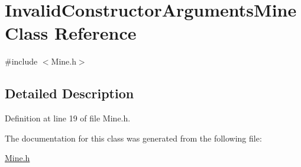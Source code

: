 \hypertarget{classInvalidConstructorArgumentsMine}{\section{Invalid\-Constructor\-Arguments\-Mine Class Reference}
\label{classInvalidConstructorArgumentsMine}
}


{\ttfamily \#include $<$Mine.\-h$>$}



\subsection{Detailed Description}


Definition at line 19 of file Mine.\-h.



The documentation for this class was generated from the following file\-:\begin{DoxyCompactItemize}
\item 
\hyperlink{Mine_8h}{Mine.\-h}\end{DoxyCompactItemize}
